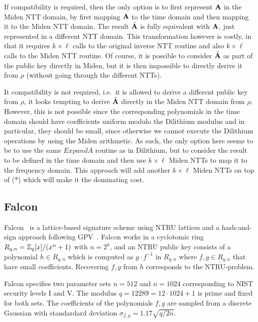 If compatibility is required, then the only option is to first represent $\mathbf{A}$ in the Miden NTT domain, by first
mapping $\mathbf{A}$ to the time domain and then mapping it to the Miden NTT domain.  The result $\tilde{\mathbf{A}}$
is fully equivalent with $\mathbf{A}$, just represented in a different NTT domain.  This transformation however is
costly, in that it requires $k \times \ell$ calls to the original inverse NTT routine and also $k \times \ell$
calls to the Miden NTT routine.  Of course, it is possible to consider $\tilde{\mathbf{A}}$ as part of the public key 
directly in Miden, but it is then impossible to directly derive it from $\rho$ (without going through the
different NTTs).

It compatibility is not required, i.e.\ it is allowed to derive a different public key from $\rho$, it looks 
tempting to derive $\tilde{\mathbf{A}}$ directly in the Miden NTT domain from $\rho$.  However, this is not possible
since the corresponding polynomials in the time domain should have coefficients uniform modulo the 
Dilithium modulus and in particular, they should be small, since otherwise we cannot execute the Dilithium
operations by using the Miden arithmetic.  As such, the only option here seems to be to use the 
same $ExpandA$ routine as in Dilithium, but to consider the result to be defined in the time domain
and then use $k \times \ell$ Miden NTTs to map it to the frequency domain.  This approach 
will add another $k \times \ell$ Miden NTTs on top of (*) which will make it the dominating cost.

\subsection{Falcon}

Falcon~\cite{falcon} is a lattice-based signature scheme using NTRU lattices and a hash-and-sign approach following GPV~\cite{GPV}.
Falcon works in a cyclotomic ring $R_{q,n} =  \mathbb{Z}_q[x]/(x^n+1)$ with $n = 2^k$, and an NTRU public key consists 
of a polynomial $h \in R_{q,n}$ which is computed as $g \cdot f^{-1}$ in $R_{q,n}$ where $f,g \in R_{q,n}$ that have small coefficients.
Recovering $f, g$ from $h$ corresponds to the NTRU-problem.  

Falcon specifies two parameter sets $n = 512$ and $n = 1024$ corresponding to NIST security levels I and V.  The modulus 
$q = 12289 = 12 \cdot 1024 + 1$ is prime and fixed for both sets.  The coefficients of the polynomials $f,g$ are sampled
from a discrete Gaussian with standardard deviation $\sigma_{f,g} = 1.17 \sqrt{q/2n}$.

